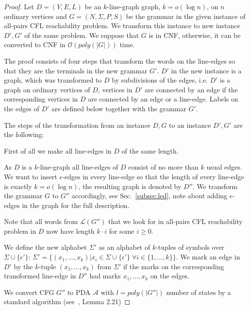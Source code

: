 \documentclass[12pt]{article}
\let\origenumerate\enumerate
\let\origendenumerate\endenumerate
\renewenvironment{enumerate}{\origenumerate[topsep = 0pt, noitemsep]}{\origendenumerate}
\begin{document}
\begin{proof}
Let $D = (V, E, L)$ be an $k$-line-graph graph, $k = o(\log n)$, on $n$ ordinary vertices and $G = (N, \Sigma, P, S)$ be the grammar in the given instance of all-pairs CFL reachability problem. We transform this instance to new instance $D', G'$ of the same problem. We suppose that $G$ is in CNF, otherwise, it can be converted to CNF in $\mathcal{O}(poly(|G|))$ time.

The proof consists of four steps that transform the words on the line-edges so that they are the terminals in the new grammar $G'$. $D'$ in the new instance is a graph, which was transformed to $D$ by subdivisions of the edges, i.e. $D'$ is a graph on ordinary vertices of $D$, vertices in $D'$ are connected by an edge if the corresponding vertices in $D$ are connected by an edge or a line-edge. Labels on the edges of $D'$ are defined below together with the grammar $G'$.

The steps of the transformation from an instance $D, G$ to an instance $D', G'$ are the following:

\begin{enumerate}
    \item First of all we make all line-edges in $D$ of the same length. 
    
    As $D$ is a $k$-line-graph all line-edges of $D$ consist of no more than $k$ usual edges. We want to insert $\epsilon$-edges in every line-edge so that the length of every line-edge is exactly $k = o(\log n)$, the resulting graph is denoted by $D''$. We transform the grammar $G$ to $G''$ accordingly, see Sec.~\ref{subsec:led}, note about adding $\epsilon$-edges in the graph for the full description.
    
    Note that all words from $\mathcal{L}(G'')$ that we look for in all-pairs CFL reachability problem in $D$ now have length $k \cdot i$ for some $i \ge 0$.
    
    \item We define the new alphabet $\Sigma'$ as an alphabet of $k$-tuples of symbols over $\Sigma \cup \{\epsilon'\}$: $\Sigma' = \{(x_1, \ldots, x_k)|x_i \in \Sigma \cup \{\epsilon'\} \; \forall i\in \{1, \ldots, k\}\}$. We mark an edge in $D'$ by the $k$-tuple $(x_1, \ldots, x_k)$ from $\Sigma'$ if the marks on the corresponding transformed line-edge in $D''$ had marks $x_1, \ldots, x_k$ on the edges.

    \item We convert CFG $G''$ to PDA $\mathcal{A}$ with $l = poly(|G''|)$ number of states by a standard algorithm (see~\cite{10.5555/524279}, Lemma 2.21)


\end{enumerate}
\end{proof}
\end{document}
